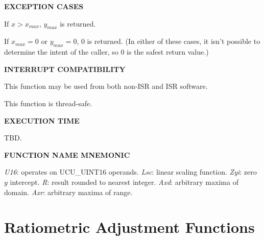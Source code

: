 \noindent\textbf{EXCEPTION CASES}
\begin{list}{}{\setlength{\leftmargin}{0.25in}\setlength{\topsep}{0.0in}}
\item If $x>x_{max}$, $y_{max}$ is returned.
\item If $x_{max}=0$ or $y_{max}=0$, 0 is returned.  (In either
      of these cases, it isn't possible to determine the intent of
      the caller, so 0 is the safest return value.)
\end{list}
\vspace{2.8ex}

\noindent\textbf{INTERRUPT COMPATIBILITY}
\begin{list}{}{\setlength{\leftmargin}{0.25in}\setlength{\topsep}{0.0in}}
\item This function may be used from both non-ISR and ISR software.
\item This function is thread-safe.
\end{list}
\vspace{2.8ex}

\noindent\textbf{EXECUTION TIME}
\begin{list}{}{\setlength{\leftmargin}{0.25in}\setlength{\topsep}{0.0in}}
\item TBD.
\end{list}
\vspace{2.8ex}

\noindent\textbf{FUNCTION NAME MNEMONIC}
\begin{list}{}{\setlength{\leftmargin}{0.25in}\setlength{\topsep}{0.0in}}
\item \emph{U16}: operates on UCU\_UINT16 operands.
      \emph{Lsc}: linear scaling function.
      \emph{Zyi}: zero $y$ intercept.
      \emph{R}:   result rounded to nearest integer.
      \emph{Axd}: arbitrary maxima of domain.
      \emph{Axr}: arbitrary maxima of range.
\end{list}


\section{Ratiometric Adjustment Functions}
\label{cafn0:sraf0}


